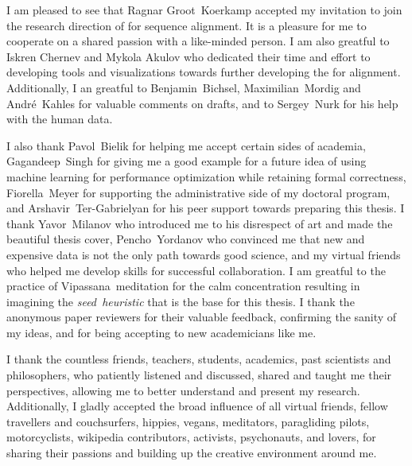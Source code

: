 I am pleased to see that Ragnar Groot~Koerkamp accepted my invitation to join
the research direction of \A for sequence alignment. It is a pleasure for me to
cooperate on a shared passion with a like-minded person. I am also greatful to
Iskren Chernev and Mykola Akulov who dedicated their time and effort to
developing tools and visualizations towards further developing the \A for
alignment. Additionally, I an greatful to Benjamin~Bichsel, Maximilian~Mordig
and André~Kahles for valuable comments on drafts, and to Sergey~Nurk for his
help with the human data.

I also thank Pavol~Bielik for helping me accept certain sides of academia,
Gagandeep~Singh for giving me a good example for a future idea of using machine
learning for performance optimization while retaining formal correctness,
Fiorella~Meyer for supporting the administrative side of my doctoral program,
and Arshavir~Ter-Gabrielyan for his peer support towards preparing this thesis.
I thank Yavor~Milanov who introduced me to his disrespect of art and made the
beautiful thesis cover, Pencho~Yordanov who convinced me that new and expensive
data is not the only path towards good science, and my virtual friends who
helped me develop skills for successful collaboration. I am greatful to the
practice of Vipassana~meditation for the calm concentration resulting in
imagining the \emph{seed~heuristic} that is the base for this thesis. I thank
the anonymous paper reviewers for their valuable feedback, confirming the sanity
of my ideas, and for being accepting to new academicians like me. 

I thank the countless friends, teachers, students, academics, past scientists
and philosophers, who patiently listened and discussed, shared and taught me
their perspectives, allowing me to better understand and present my research.
Additionally, I gladly accepted the broad influence of all virtual friends,
fellow travellers and couchsurfers, hippies, vegans, meditators, paragliding
pilots, motorcyclists, wikipedia contributors, activists, psychonauts, and
lovers, for sharing their passions and building up the creative environment
around me.

\endgroup